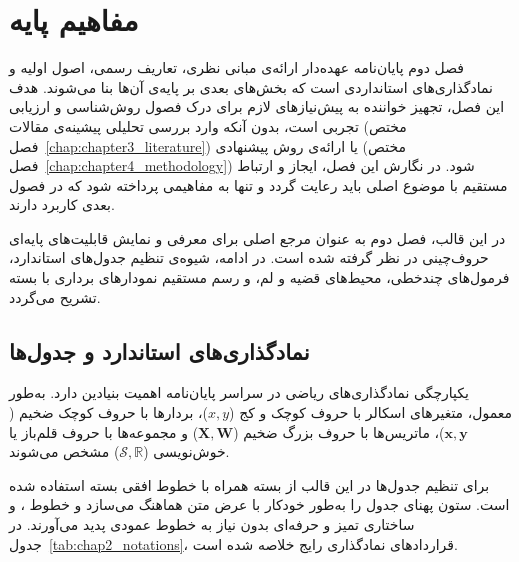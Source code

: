 

\chapter{مفاهیم پایه}\label{chap:chapter2_preliminaries}

فصل دوم پایان‌نامه عهده‌دار ارائه‌ی مبانی نظری، تعاریف رسمی، اصول اولیه و نمادگذاری‌های استانداردی است که بخش‌های بعدی بر پایه‌ی آن‌ها بنا می‌شوند. هدف این فصل، تجهیز خواننده به پیش‌نیازهای لازم برای درک فصول روش‌شناسی و ارزیابی تجربی است، بدون آنکه وارد بررسی تحلیلی پیشینه‌ی مقالات (مختص فصل~\ref{chap:chapter3_literature}) یا ارائه‌ی روش پیشنهادی (مختص فصل~\ref{chap:chapter4_methodology}) شود. در نگارش این فصل، ایجاز و ارتباط مستقیم با موضوع اصلی باید رعایت گردد و تنها به مفاهیمی پرداخته شود که در فصول بعدی کاربرد دارند.

در این قالب، فصل دوم به عنوان مرجع اصلی برای معرفی و نمایش قابلیت‌های پایه‌ای حروف‌چینی در نظر گرفته شده است. در ادامه، شیوه‌ی تنظیم جدول‌های استاندارد، فرمول‌های چندخطی، محیط‌های قضیه و لم، و رسم مستقیم نمودارهای برداری با بسته  تشریح می‌گردد.


\section{نمادگذاری‌های استاندارد و جدول‌ها}\label{sec:2-1}

یکپارچگی نمادگذاری‌های ریاضی در سراسر پایان‌نامه اهمیت بنیادین دارد. به‌طور معمول، متغیرهای اسکالر با حروف کوچک و کج ($x, y$)، بردارها با حروف کوچک ضخیم ($\mathbf{x}, \mathbf{y}$)، ماتریس‌ها با حروف بزرگ ضخیم ($\mathbf{X}, \mathbf{W}$) و مجموعه‌ها با حروف قلم‌باز یا خوش‌نویسی ($\mathcal{S}, \mathbb{R}$) مشخص می‌شوند.

برای تنظیم جدول‌ها در این قالب از بسته  همراه با خطوط افقی بسته  استفاده شده است. ستون  پهنای جدول را به‌طور خودکار با عرض متن هماهنگ می‌سازد و خطوط ،  و  ساختاری تمیز و حرفه‌ای بدون نیاز به خطوط عمودی پدید می‌آورند. در جدول~\ref{tab:chap2_notations}، قراردادهای نمادگذاری رایج خلاصه شده است.

